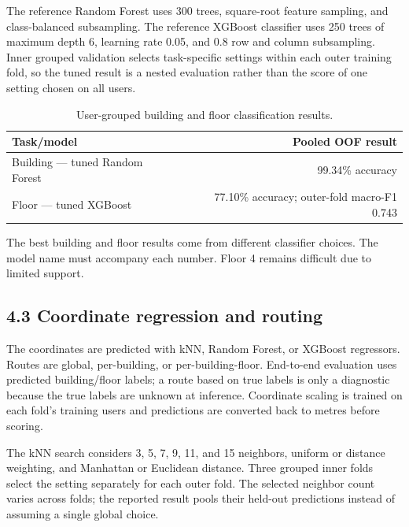 \documentclass[
  10pt,
  a4paper,
]{article}
\begin{document}
The reference Random Forest uses 300 trees, square-root feature sampling,
and class-balanced subsampling. The reference XGBoost classifier uses 250
trees of maximum depth 6, learning rate 0.05, and 0.8 row and column
subsampling. Inner grouped validation selects task-specific settings
within each outer training fold, so the tuned result is a nested
evaluation rather than the score of one setting chosen on all users.

\begin{longtable}[]{@{}lr@{}}
\caption{User-grouped building and floor classification results.}\label{tab:project_report-2}\\
\toprule\noalign{}
Task/model & Pooled OOF result \\
\midrule\noalign{}
\endhead
\bottomrule\noalign{}
\endlastfoot
Building --- tuned Random Forest & 99.34\% accuracy \\
Floor --- tuned XGBoost & 77.10\% accuracy; outer-fold macro-F1 0.743 \\
\end{longtable}

The best building and floor results come from different classifier
choices. The model name must accompany each number. Floor 4 remains
difficult due to limited support.

\subsection{4.3 Coordinate regression and
routing}\label{coordinate-regression-and-routing}

The coordinates are predicted with kNN, Random Forest, or XGBoost
regressors. Routes are global, per-building, or per-building-floor.
End-to-end evaluation uses predicted building/floor labels; a route
based on true labels is only a diagnostic because the true labels are
unknown at inference. Coordinate scaling is trained on each fold's
training users and predictions are converted back to metres before
scoring.

The kNN search considers 3, 5, 7, 9, 11, and 15 neighbors, uniform or
distance weighting, and Manhattan or Euclidean distance. Three grouped
inner folds select the setting separately for each outer fold. The
selected neighbor count varies across folds; the reported result pools
their held-out predictions instead of assuming a single global choice.
\end{document}
